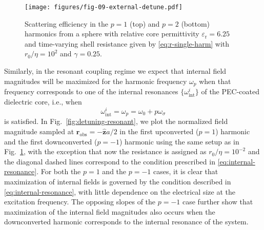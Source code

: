 \documentclass[article]{IEEEtran}
\newcommand{\T}[1]{\mathrm{#1}}
\newcommand{\V}[1]{\boldsymbol{#1}}
\begin{document}
\begin{figure}
    \centering
    \texttt{[image: figures/fig-09-external-detune.pdf]}
    \caption{Scattering efficiency in the $p=1$ (top) and $p=2$ (bottom) harmonics from a sphere with relative core permittivity $\varepsilon_\T{r}=6.25$ and time-varying shell resistance given by \eqref{eq:r-single-harm} with $r_0/\eta = 10^2$ and $\gamma = 0.25$.}
    \label{fig:detuning-weak}
\end{figure}

Similarly, in the resonant coupling regime we expect that internal field magnitudes will be maximized for the harmonic frequency $\omega_p$ when that frequency corresponds to one of the internal resonances $\{\omega_\T{int}^i\}$ of the PEC-coated dielectric core, i.e., when
\begin{equation}
    \omega_\T{int}^i = \omega_p = \omega_0 + p\omega_\sigma
    \label{eq:internal-resonance}
\end{equation}
is satisfied.  In Fig.~\ref{fig:detuning-resonant}, we plot the normalized field magnitude sampled at $\V{r}_\T{obs} = -\V{\hat{z}}a/2$ in the first  upconverted ($p=1$) harmonic and the first downconverted ($p=-1$) harmonic using the same setup as in Fig.~\ref{fig:detuning-weak}, with the exception that now the resistance is assigned as $r_0 / \eta = 10^{-2}$ and the diagonal dashed lines correspond to the condition prescribed in \eqref{eq:internal-resonance}. For both the $p=1$ and the $p=-1$ cases, it is clear that maximization of internal fields is governed by the condition described in \eqref{eq:internal-resonance}, with little dependence on the electrical size at the excitation frequency. The opposing slopes of the \mbox{$p=-1$} case further show that maximization of the internal field magnitudes also occurs when the downconverted harmonic corresponds to the internal resonance of the system. 

\end{document}
